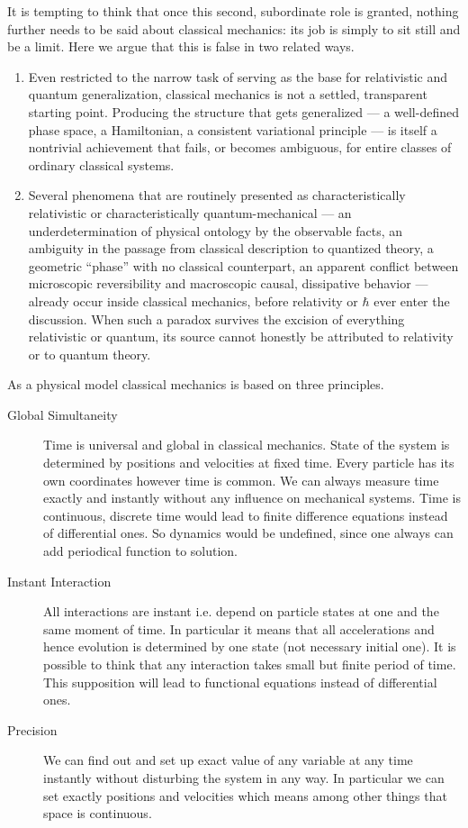 It is tempting to think that once this second, subordinate role is granted, nothing
further needs to be said about classical mechanics: its job is simply to sit still
and be a limit. Here we argue that this is false in two related ways.

\begin{enumerate}
  \item Even restricted to the narrow task of serving as the base for
  relativistic and quantum generalization, classical mechanics is not a settled,
  transparent starting point. Producing the structure that gets generalized ---
  a well-defined phase space, a Hamiltonian, a consistent variational principle
  --- is itself a nontrivial achievement that fails, or becomes ambiguous, for
  entire classes of ordinary classical systems.
  \item Several phenomena that are routinely presented as characteristically
  relativistic or characteristically quantum-mechanical --- an underdetermination
  of physical ontology by the observable facts, an ambiguity in the passage from
  classical description to quantized theory, a geometric ``phase'' with no
  classical counterpart, an apparent conflict between microscopic reversibility
  and macroscopic causal, dissipative behavior --- already occur inside classical
  mechanics, before relativity or $\hbar$ ever enter the discussion. When such a
  paradox survives the excision of everything relativistic or quantum, its source
  cannot honestly be attributed to relativity or to quantum theory.
\end{enumerate}

As a physical model classical mechanics is based on three principles.
\begin{description}
  \item[ Global Simultaneity] 
    Time is universal and global in classical mechanics. State of the system is determined by
    positions and velocities at fixed time. Every particle has its own coordinates however time
    is common. We can always measure time  exactly and instantly without any influence 
    on mechanical systems. Time is continuous, discrete time would lead to finite difference
    equations instead of differential ones. So dynamics would be undefined, since one always can
    add periodical function to solution.
  \item[ Instant Interaction]
    All interactions are instant i.e. depend on particle states at one and the same moment of time.
    In particular it means that all accelerations and hence evolution is determined by one state (not necessary initial one). It is possible to think that any interaction takes small but finite period of time. This supposition will lead to functional equations instead of differential ones.
  \item [ Precision]
    We can find out and set up exact value of any variable at any time instantly without disturbing
    the system in any way. In particular we can set exactly positions and velocities which means 
    among other things that space is continuous.
\end{description}

